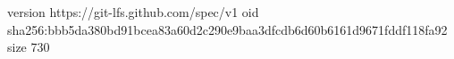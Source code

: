 version https://git-lfs.github.com/spec/v1
oid sha256:bbb5da380bd91bcea83a60d2c290e9baa3dfcdb6d60b6161d9671fddf118fa92
size 730
